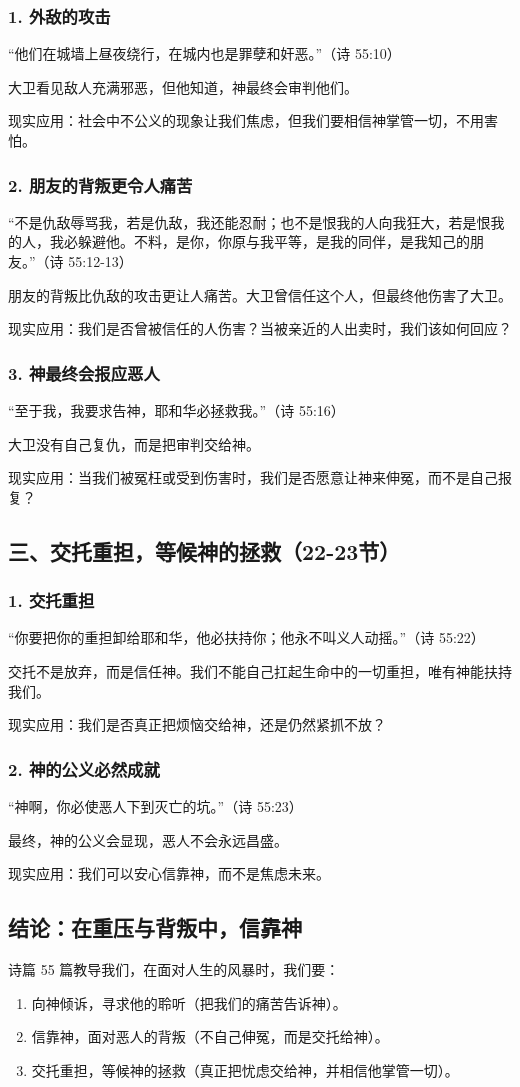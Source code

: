 \documentclass[a4paper, 12pt]{article}
\begin{document}
\subsubsection*{1. 外敌的攻击}
“他们在城墙上昼夜绕行，在城内也是罪孽和奸恶。”（诗 55:10）

大卫看见敌人充满邪恶，但他知道，神最终会审判他们。

现实应用：社会中不公义的现象让我们焦虑，但我们要相信神掌管一切，不用害怕。
\subsubsection*{2. 朋友的背叛更令人痛苦}
“不是仇敌辱骂我，若是仇敌，我还能忍耐；也不是恨我的人向我狂大，若是恨我的人，我必躲避他。不料，是你，你原与我平等，是我的同伴，是我知己的朋友。”（诗 55:12-13）

朋友的背叛比仇敌的攻击更让人痛苦。大卫曾信任这个人，但最终他伤害了大卫。

现实应用：我们是否曾被信任的人伤害？当被亲近的人出卖时，我们该如何回应？
\subsubsection*{3. 神最终会报应恶人}
“至于我，我要求告神，耶和华必拯救我。”（诗 55:16）

大卫没有自己复仇，而是把审判交给神。

现实应用：当我们被冤枉或受到伤害时，我们是否愿意让神来伸冤，而不是自己报复？
\subsection*{三、交托重担，等候神的拯救（22-23节）}
\subsubsection*{1. 交托重担}
“你要把你的重担卸给耶和华，他必扶持你；他永不叫义人动摇。”（诗 55:22）

交托不是放弃，而是信任神。我们不能自己扛起生命中的一切重担，唯有神能扶持我们。

现实应用：我们是否真正把烦恼交给神，还是仍然紧抓不放？
\subsubsection*{2. 神的公义必然成就}
“神啊，你必使恶人下到灭亡的坑。”（诗 55:23）

最终，神的公义会显现，恶人不会永远昌盛。

现实应用：我们可以安心信靠神，而不是焦虑未来。
\subsection*{结论：在重压与背叛中，信靠神}
诗篇 55 篇教导我们，在面对人生的风暴时，我们要：
\begin{enumerate}
    \item 向神倾诉，寻求他的聆听（把我们的痛苦告诉神）。

    \item 信靠神，面对恶人的背叛（不自己伸冤，而是交托给神）。

    \item 交托重担，等候神的拯救（真正把忧虑交给神，并相信他掌管一切）。

\end{enumerate}
\end{document}
